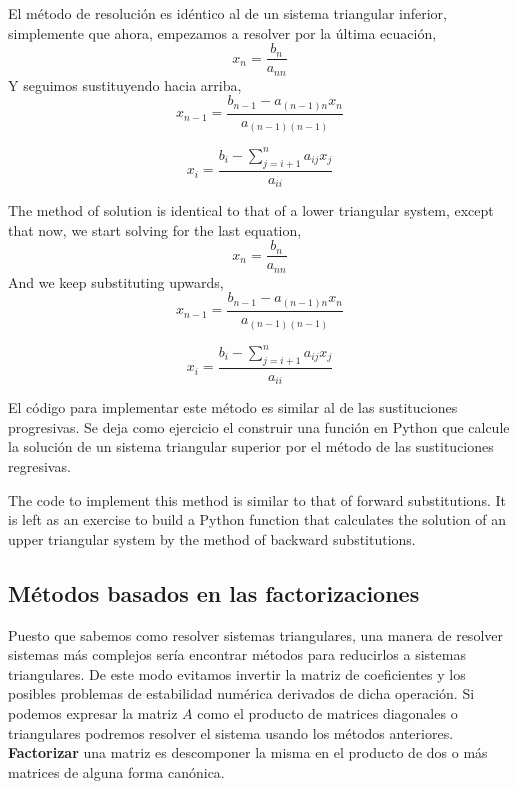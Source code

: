 \begin{paracol}{2}
    El método de resolución es idéntico al de un sistema triangular inferior, simplemente que ahora, empezamos a resolver por la última ecuación,
\begin{equation*}
x_n=\frac{b_n}{a_{nn}}
\end{equation*}
Y seguimos sustituyendo hacia arriba,
\begin{equation*}
x_{n-1}=\frac{b_{n-1}-a_{(n-1)n}x_{n}}{a_{(n-1)(n-1)}}
\end{equation*}

\begin{equation*}
x_i=\frac{b_i-\sum_{j=i+1}^{n}a_{ij}x_j}{a_{ii}}
\end{equation*}

\switchcolumn
  The method of solution is identical to that of a lower triangular system, except that now, we start solving for the last equation,
\begin{equation*}
x_n=\frac{b_n}{a_{nn}}
\end{equation*}
And we keep substituting upwards,
\begin{equation*}
x_{n-1}=\frac{b_{n-1}-a_{(n-1)n}x_{n}}{a_{(n-1)(n-1)}}
\end{equation*}

\begin{equation*}
x_i=\frac{b_i-\sum_{j=i+1}^{n}a_{ij}x_j}{a_{ii}}
\end{equation*}

\switchcolumn

El código para implementar este método es similar al de las sustituciones progresivas. Se deja como ejercicio el construir una función en Python que calcule la solución de un sistema triangular superior por el método de las sustituciones regresivas.

\switchcolumn
The code to implement this method is similar to that of forward substitutions. It is left as an exercise to build a Python function that calculates the solution of an upper triangular system by the method of backward substitutions.
\switchcolumn
\subsection{Métodos basados en las factorizaciones}
Puesto que sabemos como resolver sistemas triangulares, una manera de resolver sistemas más complejos sería encontrar métodos para reducirlos a sistemas triangulares. De este modo evitamos invertir la matriz de coeficientes y los posibles problemas de estabilidad numérica derivados de dicha operación. Si podemos expresar la matriz $A$ como el producto de matrices diagonales o triangulares podremos resolver el sistema usando los métodos anteriores. \textbf{Factorizar} una matriz es descomponer la misma en el producto de dos o más matrices de alguna forma canónica.


\end{paracol}
